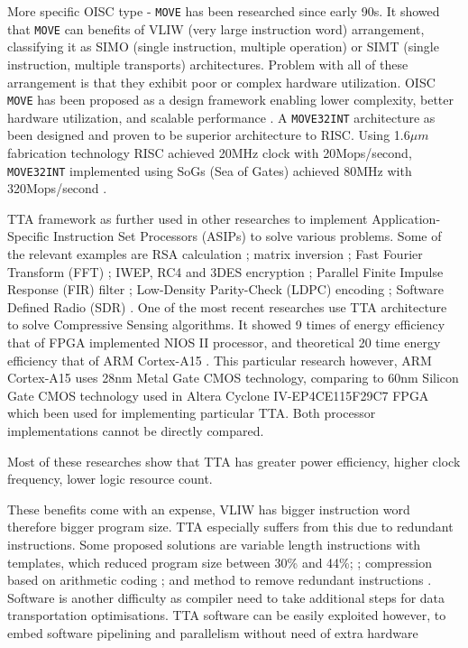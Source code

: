 More specific OISC type - \texttt{MOVE} has been researched since early 90s. It showed that \texttt{MOVE} can benefits of VLIW (very large instruction word) arrangement, classifying it as SIMO (single instruction, multiple operation) or SIMT (single instruction, multiple transports) architectures. Problem with all of these arrangement is that they exhibit poor or complex hardware utilization. OISC \texttt{MOVE} has been proposed as a design framework enabling lower complexity, better hardware utilization, and scalable performance \autocite{5348869}. A \texttt{MOVE32INT} architecture as been designed \autocite{Corporaal94move32int} and proven to be superior architecture to RISC. Using 1.6$\mu m$ fabrication technology RISC achieved 20MHz clock with 20Mops/second, \texttt{MOVE32INT} implemented using SoGs (Sea of Gates) achieved 80MHz with 320Mops/second \autocite{289981}.

TTA framework as further used in other researches to implement Application-Specific Instruction Set Processors (ASIPs) to solve various problems. Some of the relevant examples are RSA calculation \autocite{6128530}; matrix inversion \autocite{1540373}; Fast Fourier Transform (FFT) \autocite{8682289}; IWEP, RC4 and 3DES encryption \autocite{922340}; Parallel Finite Impulse Response (FIR) filter \autocite{1511285}; Low-Density Parity-Check (LDPC) encoding \autocite{6855236}; Software Defined Radio (SDR) \autocite{7363689}. One of the most recent researches use TTA architecture to solve Compressive Sensing algorithms. It showed 9 times of energy efficiency that of FPGA implemented NIOS II processor, and theoretical 20 time energy efficiency that of ARM Cortex-A15 \autocite{8573494}. This particular research however, ARM Cortex-A15 uses 28nm Metal Gate CMOS technology, comparing to 60nm Silicon Gate CMOS technology used in Altera Cyclone IV-EP4CE115F29C7 FPGA which been used for implementing particular TTA. Both processor implementations cannot be directly compared.

Most of these researches show that TTA has greater power efficiency, higher clock frequency, lower logic resource count. 

These benefits come with an expense, VLIW has bigger instruction word therefore bigger program size. TTA especially suffers from this due to redundant instructions. Some proposed solutions are variable length instructions with templates, which reduced program size between 30\% and 44\%; \autocite{1213033,6893206}; compression based on arithmetic coding \autocite{4627144}; and method to remove redundant instructions \autocite{5403730}. 
Software is another difficulty as compiler need to take additional steps for data transportation optimisations. TTA software can be easily exploited however, to embed software pipelining and parallelism without need of extra hardware\autocite{4595596}

